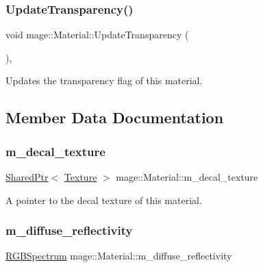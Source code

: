 \subsubsection{\texorpdfstring{Update\+Transparency()}{UpdateTransparency()}}
{\footnotesize\ttfamily void mage\+::\+Material\+::\+Update\+Transparency (\begin{DoxyParamCaption}{ }\end{DoxyParamCaption})\hspace{0.3cm}{\ttfamily [private]}, {\ttfamily [noexcept]}}

Updates the transparency flag of this material. 

\subsection{Member Data Documentation}
\hypertarget{structmage_1_1_material_acdab45e5d78ddbb7f717d9db67ff3fcf}{}\label{structmage_1_1_material_acdab45e5d78ddbb7f717d9db67ff3fcf} 
\subsubsection{\texorpdfstring{m\+\_\+decal\+\_\+texture}{m\_decal\_texture}}
{\footnotesize\ttfamily \hyperlink{namespacemage_a1e01ae66713838a7a67d30e44c67703e}{Shared\+Ptr}$<$ \hyperlink{classmage_1_1_texture}{Texture} $>$ mage\+::\+Material\+::m\+\_\+decal\+\_\+texture\hspace{0.3cm}{\ttfamily [private]}}

A pointer to the decal texture of this material. \hypertarget{structmage_1_1_material_afd2cc813023698e52edc01b267a17e6c}{}\label{structmage_1_1_material_afd2cc813023698e52edc01b267a17e6c} 
\subsubsection{\texorpdfstring{m\+\_\+diffuse\+\_\+reflectivity}{m\_diffuse\_reflectivity}}
{\footnotesize\ttfamily \hyperlink{structmage_1_1_r_g_b_spectrum}{R\+G\+B\+Spectrum} mage\+::\+Material\+::m\+\_\+diffuse\+\_\+reflectivity\hspace{0.3cm}{\ttfamily [private]}}

